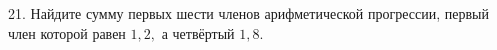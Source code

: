 21. Найдите сумму первых шести членов арифметической прогрессии, первый член которой равен $1,2,$ а четвёртый $1,8.$\\
